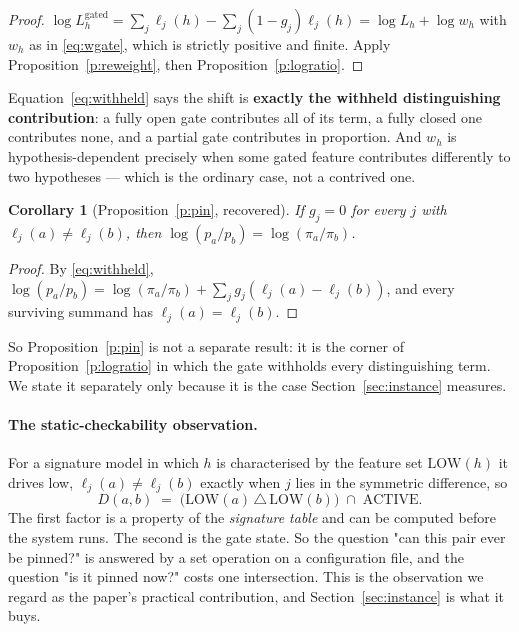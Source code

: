 \documentclass[11pt,a4paper]{article}
\newtheorem{corollary}[proposition]{Corollary}
\theoremstyle{definition}
\begin{document}
\begin{proof}
$\log L_h^{\mathrm{gated}} = \sum_j \ell_j(h) - \sum_j (1-g_j)\ell_j(h)
= \log L_h + \log w_h$ with $w_h$ as in \eqref{eq:wgate}, which is strictly
positive and finite. Apply Proposition~\ref{p:reweight}, then
Proposition~\ref{p:logratio}.
\end{proof}

Equation~\eqref{eq:withheld} says the shift is \textbf{exactly the withheld
distinguishing contribution}: a fully open gate contributes all of its term,
a fully closed one contributes none, and a partial gate contributes in
proportion. And $w_h$ is hypothesis-dependent precisely when some gated
feature contributes differently to two hypotheses --- which is the ordinary
case, not a contrived one.

\begin{corollary}[Proposition~\ref{p:pin}, recovered]\label{c:pinned}
If $g_j=0$ for every $j$ with $\ell_j(a)\ne\ell_j(b)$, then
$\log(p_a/p_b)=\log(\pi_a/\pi_b)$.
\end{corollary}
\begin{proof}
By \eqref{eq:withheld},
$\log(p_a/p_b) = \log(\pi_a/\pi_b) + \sum_j g_j(\ell_j(a)-\ell_j(b))$, and
every surviving summand has $\ell_j(a)=\ell_j(b)$.
\end{proof}

So Proposition~\ref{p:pin} is not a separate result: it is the corner of
Proposition~\ref{p:logratio} in which the gate withholds every distinguishing
term. We state it separately only because it is the case
Section~\ref{sec:instance} measures.

\paragraph{The static-checkability observation.} For a signature model in
which $h$ is characterised by the feature set $\mathrm{LOW}(h)$ it drives low,
$\ell_j(a)\neq\ell_j(b)$ exactly when $j$ lies in the symmetric difference, so
\begin{equation}
D(a,b) \;=\; \big(\mathrm{LOW}(a) \,\triangle\, \mathrm{LOW}(b)\big)
\;\cap\; \mathrm{ACTIVE} .
\label{eq:Dsym}
\end{equation}
The first factor is a property of the \emph{signature table} and can be
computed before the system runs. The second is the gate state. So the question
"can this pair ever be pinned?" is answered by a set operation on a
configuration file, and the question "is it pinned now?" costs one
intersection. This is the observation we regard as the paper's practical
contribution, and Section~\ref{sec:instance} is what it buys.
\end{document}
